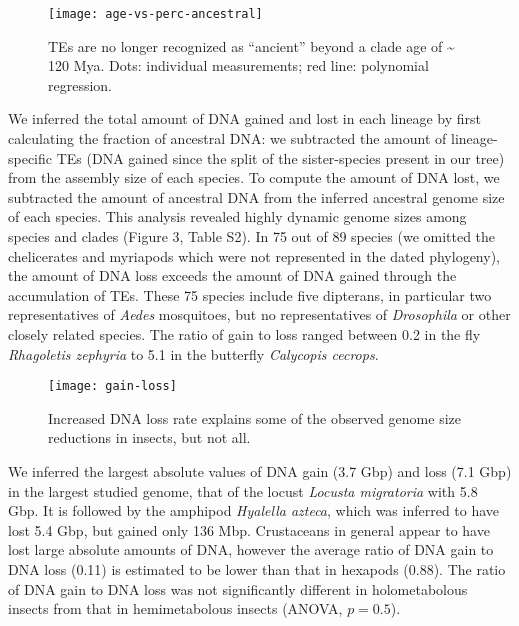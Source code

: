 \begin{figure}[h!]
\begin{center}
\texttt{[image: age-vs-perc-ancestral]}
\caption[TEs are no longer recognized as ``ancient'' beyond a clade age of
\textasciitilde{} 120 Mya]{{TEs are no longer recognized as ``ancient'' beyond a clade age of
\textasciitilde{} 120 Mya. Dots: individual measurements; red line:
polynomial regression.
{\label{807049}}%
}}
\end{center}
\end{figure}

We inferred the total amount of DNA gained and lost in each lineage by
first calculating the fraction of ancestral DNA: we subtracted the
amount of lineage-specific TEs (DNA gained since the split of the
sister-species present in our tree) from the assembly size of each
species. To compute the amount of DNA lost, we subtracted the amount of
ancestral DNA from the inferred ancestral genome size of each species.
This analysis revealed highly dynamic genome sizes among species and
clades (Figure 3, Table S2). In 75 out of 89 species (we omitted the
chelicerates and myriapods which were not represented in the dated
phylogeny), the amount of DNA loss exceeds the amount of DNA gained
through the accumulation of TEs. These 75 species include five
dipterans, in particular two representatives of \emph{Aedes} mosquitoes,
but no representatives of \emph{Drosophila} or other closely related
species. The ratio of gain to loss ranged between 0.2 in the fly
\emph{Rhagoletis zephyria} to 5.1 in the butterfly \emph{Calycopis
cecrops}.

\begin{figure}[h!]
\begin{center}
\texttt{[image: gain-loss]}
\caption[DNA gain and loss due to TE activity]{{Increased DNA loss rate explains some of the observed genome size
reductions in insects, but not all.
{\label{700745}}%
}}
\end{center}
\end{figure}

We inferred the largest absolute values of DNA gain (3.7 Gbp) and loss
(7.1 Gbp) in the largest studied genome, that of the locust
\emph{Locusta migratoria} with 5.8 Gbp. It is followed by the amphipod
\emph{Hyalella azteca}, which was inferred to have lost 5.4 Gbp, but
gained only 136 Mbp. Crustaceans in general appear to have lost large
absolute amounts of DNA, however the average ratio of DNA gain to DNA
loss (0.11) is estimated to be lower than that in hexapods (0.88). The
ratio of DNA gain to DNA loss was not significantly different in
holometabolous insects from that in hemimetabolous insects (ANOVA,
\(p = 0.5\)).

